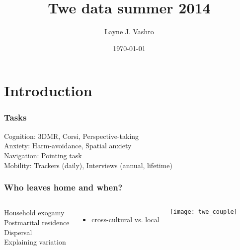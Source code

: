 \documentclass{beamer}
\title[Twe data summer 2014]{Twe data summer 2014} %
\author{Layne J. Vashro} %
\institute[Utah] %
{
University of Utah \\ %
\medskip
\textit{Layne.Vashro@anthro.utah.edu} %
}
\date{\today} %
\begin{document}
\begin{frame}
\titlepage %
\end{frame}




\section{Introduction}


\begin{frame}

\frametitle{Tasks}

Cognition: 3DMR, Corsi, Perspective-taking \\
\vspace{0.75cm}
Anxiety: Harm-avoidance, Spatial anxiety \\
\vspace{0.75cm}
Navigation: Pointing task \\
\vspace{0.75cm}
Mobility: Trackers (daily), Interviews (annual, lifetime)

\end{frame}


\begin{frame}
\frametitle{Who leaves home and when?}
\begin{columns}[c] %


Household exogamy \\
\vspace{0.25cm}
Postmarital residence \\
\vspace{0.25cm}
Dispersal \\
\vspace{0.25cm}
Explaining variation
	\begin{itemize}
		\item cross-cultural vs. local
	\end{itemize}

\texttt{[image: twe\_couple]}

\end{columns}
\end{frame}
\end{document}
